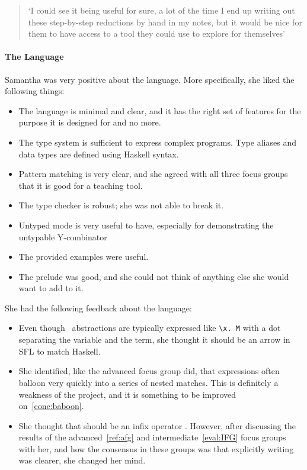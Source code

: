 \begin{quotation}
\noindent `I could see it being useful for sure, a lot of the time I end up writing out these step-by-step reductions by hand in my notes, but it would be nice for them to have access to a tool they could use to explore for themselves'
\end{quotation}

\paragraph{The Language}
Samantha was very positive about the language. More specifically, she liked the following things:

\begin{itemize}
    \item The language is minimal and clear, and it has the right set of features for the purpose it is designed for and no more.
    \item The type system is sufficient to express complex programs. Type aliases and data types are defined using Haskell syntax. 
    \item Pattern matching is very clear, and she agreed with all three focus groups that it is good for a teaching tool. 
    \item The type checker is robust; she was not able to break it. 
    \item Untyped mode is very useful to have, especially for demonstrating the untypable Y-combinator
    \item The provided examples were useful. 
    \item The prelude was good, and she could not think of anything else she would want to add to it. 
\end{itemize}

\noindent She had the following feedback about the language:

\begin{itemize}
    \item Even though \lcalc\ abstractions are typically expressed like \verb|\x. M| with a dot separating the variable and the term, she thought it should be an arrow in \ac{SFL} to match Haskell.
    \item She identified, like the advanced focus group did, that expressions often balloon very quickly into a series of nested matches. This is definitely a weakness of the project, and it is something to be improved on~\ref{conc:baboon}.
    \item She thought that  should be an infix operator \sflinline{:}. However, after discussing the results of the advanced~\ref{ref:afg} and intermediate~\ref{eval:IFG} focus groups with her, and how the consensus in these groups was that explicitly writing  was clearer, she changed her mind. 
\end{itemize}

